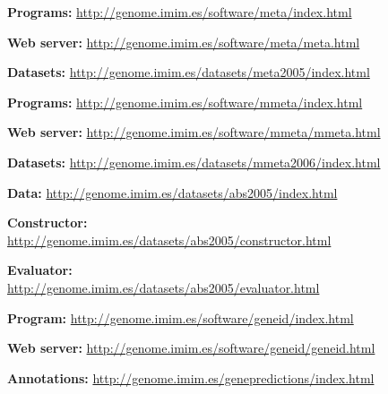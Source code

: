 

\begin{mitemize}
\item
\textbf{Programs:} \url{http://genome.imim.es/software/meta/index.html}
\item
\textbf{Web server:} \url{http://genome.imim.es/software/meta/meta.html}
\item
\textbf{Datasets:} \url{http://genome.imim.es/datasets/meta2005/index.html}
\end{mitemize}


\begin{mitemize}
\item
\textbf{Programs:} \url{http://genome.imim.es/software/mmeta/index.html}
\item
\textbf{Web server:} \url{http://genome.imim.es/software/mmeta/mmeta.html}
\item
\textbf{Datasets:} \url{http://genome.imim.es/datasets/mmeta2006/index.html}
\end{mitemize}


\begin{mitemize}
\item
\textbf{Data:}
\url{http://genome.imim.es/datasets/abs2005/index.html}
\item
\textbf{Constructor:}\\ 
\url{http://genome.imim.es/datasets/abs2005/constructor.html}
\item
\textbf{Evaluator:}\\ 
\url{http://genome.imim.es/datasets/abs2005/evaluator.html}
\end{mitemize}



\begin{mitemize}
\item
\textbf{Program:} \url{http://genome.imim.es/software/geneid/index.html}
\item
\textbf{Web server:} \url{http://genome.imim.es/software/geneid/geneid.html}
\item
\textbf{Annotations:} \url{http://genome.imim.es/genepredictions/index.html}
\end{mitemize}


